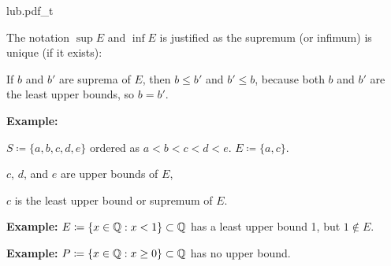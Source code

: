 \documentclass[10pt,aspectratio=169]{beamer}
\begin{document}
\begin{frame}
{lub.pdf_t}

\pause
\medskip

The notation $\sup E$ and $\inf E$ is justified as
the
supremum (or infimum) is unique (if it exists):

\pause
\medskip

If $b$ and
$b'$ are suprema of $E$, then $b \leq b'$ and $b' \leq b$, because both
$b$ and $b'$ are the least upper bounds, so $b=b'$.

\pause
\medskip

\textbf{Example:}

$S \coloneqq \{ a, b, c, d, e \}$ ordered as $a < b < c < d < e$.
\qquad
$E \coloneqq \{ a, c \}$.

\pause

$c$, $d$, and $e$ are upper bounds of $E$,

\pause

$c$ is the least upper bound or supremum of $E$.

\medskip
\pause

\textbf{Example:}
$E \coloneqq \{ x \in {\mathbb{Q}} : x < 1 \} \subset {\mathbb{Q}}$ has a least upper bound 1, but
$1 \notin E$.

\medskip
\pause

\textbf{Example:}
$P \coloneqq \{ x \in {\mathbb{Q}} : x \geq 0 \} \subset {\mathbb{Q}}$ has no upper bound.

\end{frame}
\end{document}
